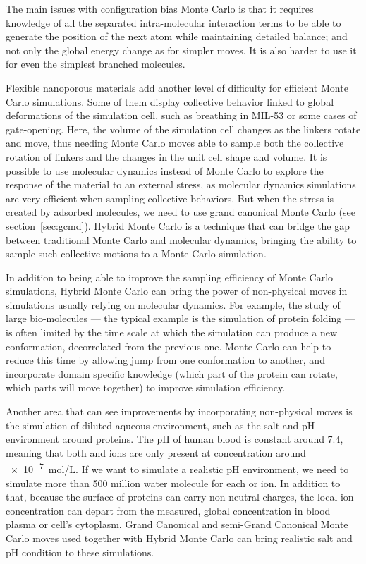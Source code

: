 \documentclass[thesis]{subfiles}
\begin{document}
The main issues with configuration bias Monte Carlo is that it requires
knowledge of all the separated intra-molecular interaction terms to be able to
generate the position of the next atom while maintaining detailed balance; and
not only the global energy change as for simpler moves. It is also harder to use
it for even the simplest branched molecules.

Flexible nanoporous materials add another level of difficulty for efficient
Monte Carlo simulations. Some of them display collective behavior linked to
global deformations of the simulation cell, such as breathing in MIL-53 or some
cases of gate-opening. Here, the volume of the simulation cell changes as the
linkers rotate and move, thus needing Monte Carlo moves able to sample both the
collective rotation of linkers and the changes in the unit cell shape and
volume. It is possible to use molecular dynamics instead of Monte Carlo to
explore the response of the material to an external stress, as molecular
dynamics simulations are very efficient when sampling collective behaviors. But
when the stress is created by adsorbed molecules, we need to use grand canonical
Monte Carlo (see section~\ref{sec:gcmd}). Hybrid Monte Carlo is a technique that
can bridge the gap between traditional Monte Carlo and molecular dynamics,
bringing the ability to sample such collective motions to a Monte Carlo
simulation\cite{Rogge2019}.

In addition to being able to improve the sampling efficiency of Monte Carlo
simulations, Hybrid Monte Carlo can bring the power of non-physical moves in
simulations usually relying on molecular dynamics. For example, the study of
large bio-molecules --- the typical example is the simulation of protein folding
--- is often limited by the time scale at which the simulation can produce a new
conformation, decorrelated from the previous one\cite{Izaguirre2004}. Monte
Carlo can help to reduce this time by allowing jump from one conformation to
another, and incorporate domain specific knowledge (which part of the protein
can rotate, which parts will move together) to improve simulation efficiency.

Another area that can see improvements by incorporating non-physical moves is
the simulation of diluted aqueous environment, such as the salt and pH
environment around proteins. The pH of human blood is constant around 7.4,
meaning that both  and  ions are only present at concentration
around \SI{e-7}{mol/L}. If we want to simulate a realistic pH environment, we
need to simulate more than 500 million water molecule for each  or
 ion. In addition to that, because the surface of proteins can carry
non-neutral charges, the local ion concentration can depart from the measured,
global concentration in blood plasma or cell's cytoplasm. Grand Canonical and
semi-Grand Canonical Monte Carlo moves used together with Hybrid Monte Carlo can
bring realistic salt and pH condition to these simulations\cite{Ross2018}.
\end{document}
